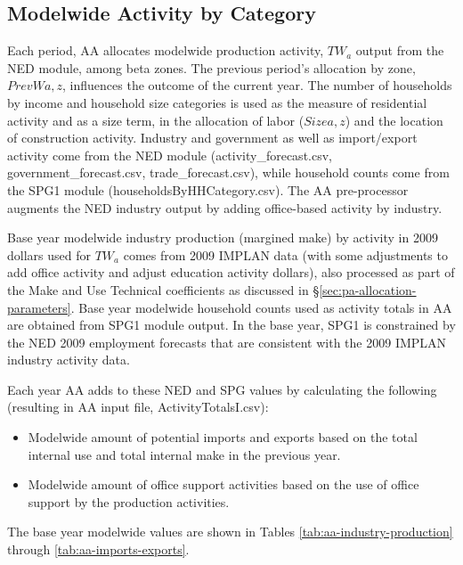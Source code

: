 \subsection{Modelwide Activity by Category}
Each period, AA allocates modelwide production activity, $TW_a$ output from the NED module, among beta zones. The previous period's allocation by zone, $PrevWa,z$, influences the outcome of the current year. The number of households by income and household size categories is used as the measure of residential activity and as a size term, in the allocation of labor ($Sizea,z$) and the location of construction activity. Industry and government as well as import/export activity come from the NED module (activity\_forecast.csv, government\_forecast.csv, trade\_forecast.csv), while household counts come from the SPG1 module (householdsByHHCategory.csv). The AA pre-processor augments the NED industry output by adding office-based activity by industry.

Base year modelwide industry production (margined make) by activity in 2009 dollars used for $TW_a$ comes from 2009 IMPLAN data (with some adjustments to add office activity and adjust education activity dollars), also processed as part of the Make and Use Technical coefficients as discussed in \S\ref{sec:pa-allocation-parameters}. Base year modelwide household counts used as activity totals in AA are obtained from SPG1 module output. In the base year, SPG1 is constrained by the NED 2009 employment forecasts that are consistent with the 2009 IMPLAN industry activity data. 

Each year AA adds to these NED and SPG values by calculating the following (resulting in AA input file, ActivityTotalsI.csv):
\begin{itemize}
\item Modelwide amount of potential imports and exports based on the total internal use and total internal make in the previous year.  
\item Modelwide amount of office support activities based on the use of office support by the production activities.
\end{itemize}
\noindent The base year modelwide values are shown in Tables \ref{tab:aa-industry-production} through \ref{tab:aa-imports-exports}.



